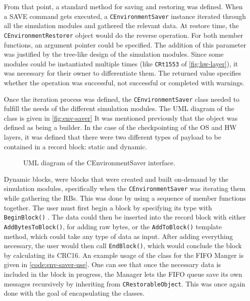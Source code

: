 {From that point, a standard method for saving and restoring was defined. When a SAVE command gets executed, a \texttt{CEnvironmentSaver} instance iterated through all the simulation modules and gathered the relevant data. At restore time, the \texttt{CEnvironmentRestorer} object would do the reverse operation. For both member functions, an argument pointer could be specified. The addition of this parameter was justified by the tree-like design of the simulation modules. Since some modules could be instantiated multiple times (like \texttt{CRt1553} of \autoref{fig:hw-layer}), it was necessary for their owner to differentiate them. The returned value specifies whether the operation was successful, not successful or completed with warnings. 

Once the iteration process was defined, the \texttt{CEnvironmentSaver} class needed to fulfill the needs of the different simulation modules. The UML diagram of the class is given in \autoref{fig:env-saver} It was mentioned previously that the object was defined as being a builder. In the case of the checkpointing of the OS and HW layers, it was defined that there were two different types of payload to be contained in a record block: static and dynamic. 

\begin{figure}[htbp]
	\centering
	\vspace{12pt}
	\footnotesize
	
	\caption{UML diagram of the CEnvironmentSaver interface.}
	\label{fig:env-saver}
\end{figure}


Dynamic blocks, were blocks that were created and built on-demand by the simulation modules, specifically when the \texttt{CEnvironmentSaver} was iterating them while gathering the RBs. This was done by using a sequence of member functions together. The user must first begin a block by specifying its type with \texttt{BeginBlock()} . The data could then be inserted into the record block with either \texttt{AddBytesToBlock()}, for adding raw bytes, or the \texttt{AddToBlock()} template method, which could take any type of data as input. After adding everything necessary, the user would then call \texttt{EndBlock()}, which would conclude the block by calculating its CRC16. An example usage of the class for the FIFO Manger is given in \autoref{code:env-saver-use}. One can see that once the necessary data is included in the block in progress, the Manager lets the FIFO queue save its own messages recursively by inheriting from \texttt{CRestorableObject}. This was once again done with the goal of encapsulating the classes.

}
